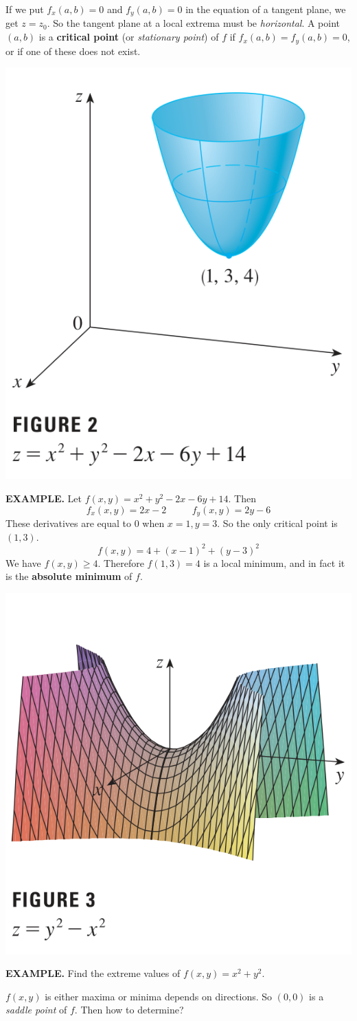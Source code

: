 \documentclass{article}
\begin{document}
If we put $f_x(a,b) = 0  $ and $f_y(a,b) = 0 $ in the equation of a tangent plane, we get $z = z_0$. So the tangent plane at a local extrema must be \textit{horizontal}.
A point $(a,b)$ is a \textbf{critical point} (or \textit{stationary point})  of $f$ if $f_x(a,b) = f_y(a,b) = 0$, or if one of these does not exist.

\begin{minipage}[]{0.3\linewidth}
  \includegraphics[width = 4.3 cm]{./images/min1}
  
\end{minipage}
\begin{minipage}[]{0.67\linewidth}

{\selectfont \textbf{\textcolor{blue5}{ EXAMPLE.}}} Let $f(x,y) = x^2 + y^2 -2x - 6y + 14 $. Then 
\[f_x(x,y) = 2x - 2 \quad \text{ } \quad f_y(x,y) = 2y - 6 \]
These derivatives are equal to 0 when $x = 1, y = 3$. So the only critical point is $(1,3)$. 
\[f(x,y) = 4 + (x-1)^2 + (y-3)^2\]
We have $f(x,y) \ge 4 $. Therefore $f(1,3) = 4$ is a local minimum, and in fact it is the \textbf{absolute minimum} of $f$.
  
\end{minipage}

\begin{minipage}[]{0.3\linewidth}
  \includegraphics[width = 4.3 cm]{./images/saddle.png}
  
\end{minipage}
\begin{minipage}[]{0.67\linewidth}
  {\selectfont \textbf{\textcolor{blue5}{ EXAMPLE.}}} Find the extreme values of $f(x,y) = x^2 + y^2 $.

 $f(x,y)$ is either maxima or minima depends on directions. So $(0,0)$ is a \textit{saddle point} of $f$. Then how to determine?
\end{minipage}
\end{document}
